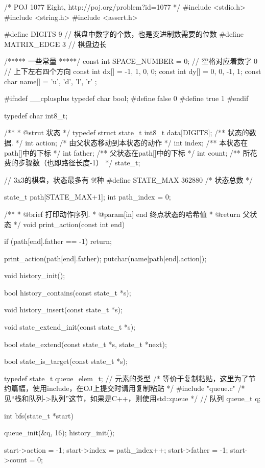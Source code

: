 \begin{Codex}[label=eight_digits_bfs2.c]
/* POJ 1077 Eight, http://poj.org/problem?id=1077 */
#include <stdio.h>
#include <string.h>
#include <assert.h>

#define DIGITS 9 // 棋盘中数字的个数，也是变进制数需要的位数
#define     MATRIX_EDGE 3       // 棋盘边长

/***** 一些常量 *****/
const int SPACE_NUMBER = 0; // 空格对应着数字 0
// 上下左右四个方向
const int dx[] = {-1, 1, 0, 0};
const int dy[] = {0, 0, -1, 1};
const char name[] = { 'u', 'd', 'l', 'r' };

#ifndef __cplusplus
typedef char bool;
#define false 0
#define true 1
#endif

typedef char int8_t;

/**
 * @strut 状态
 */
typedef struct state_t {
    int8_t data[DIGITS];  /** 状态的数据. */
    int action; /* 由父状态移动到本状态的动作 */
    int index;  /** 本状态在path[]中的下标 */
    int father; /** 父状态在path[]中的下标 */
    int count;  /** 所花费的步骤数（也即路径长度-1） */
} state_t;

// 3x3的棋盘，状态最多有 9!种
#define STATE_MAX 362880  /* 状态总数 */

state_t path[STATE_MAX+1];
int path_index = 0;

/**
 * @brief 打印动作序列.
 * @param[in] end 终点状态的哈希值
 * @return 父状态
 */
void print_action(const int end) {
    if (path[end].father == -1) return;

    print_action(path[end].father);
    putchar(name[path[end].action]);
}

void history_init();

bool history_contains(const state_t *s);

void history_insert(const state_t *s);

void state_extend_init(const state_t *s);

bool state_extend(const state_t *s, state_t *next);

bool state_is_target(const state_t *s);

typedef state_t queue_elem_t; // 元素的类型
/* 等价于复制粘贴，这里为了节约篇幅，使用include，在OJ上提交时请用复制粘贴 */
#include "queue.c"  /* 见“栈和队列->队列”这节，如果是C++，则使用std::queue */
// 队列
queue_t q;

int bfs(state_t *start) {
    queue_init(&q, 16);
    history_init();

    start->action = -1;
    start->index = path_index++;
    start->father = -1;
    start->count = 0;

}
\end{Codex}
